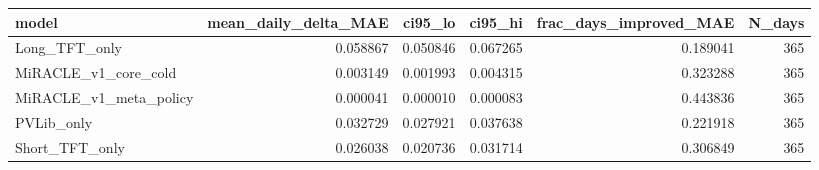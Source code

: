 \begin{tabular}{lrrrrr}
\toprule
model & mean_daily_delta_MAE & ci95_lo & ci95_hi & frac_days_improved_MAE & N_days \\
\midrule
Long_TFT_only & 0.058867 & 0.050846 & 0.067265 & 0.189041 & 365 \\
MiRACLE_v1_core_cold & 0.003149 & 0.001993 & 0.004315 & 0.323288 & 365 \\
MiRACLE_v1_meta_policy & 0.000041 & 0.000010 & 0.000083 & 0.443836 & 365 \\
PVLib_only & 0.032729 & 0.027921 & 0.037638 & 0.221918 & 365 \\
Short_TFT_only & 0.026038 & 0.020736 & 0.031714 & 0.306849 & 365 \\
\bottomrule
\end{tabular}
